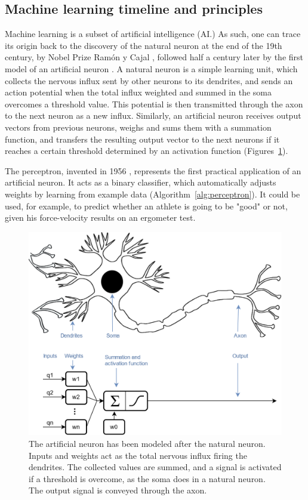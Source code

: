 \subsection{Machine learning timeline and principles}

Machine learning is a subset of artificial intelligence (AI.) As such, one can trace its origin back to the discovery of the natural neuron at the end of the 19th century, by Nobel Prize Ramón y Cajal \cite{Lopez2006}, followed half a century later by the first model of an artificial neuron \cite{Mcculloch1943}. A natural neuron is a simple learning unit, which collects the nervous influx sent by other neurons to its dendrites, and sends an action potential when the total influx weighted and summed in the soma overcomes a threshold value. This potential is then transmitted through the axon to the next neuron as a new influx. Similarly, an artificial neuron receives output vectors from previous neurons, weighs and sums them with a summation function, and transfers the resulting output vector to the next neurons if it reaches a certain threshold determined by an activation function (Figures~\ref{fig_neuron}). 

The perceptron, invented in 1956 \cite{Rosenblatt1958}, represents the first practical application of an artificial neuron. It acts as a binary classifier, which automatically adjusts weights by learning from example data (Algorithm~\ref{alg:perceptron}). It could be used, for example, to predict whether an athlete is going to be "good" or not, given his force-velocity results on an ergometer test. 

\newpage


\begin{figure}[hbtp]
	\centering
	\def\svgwidth{1\columnwidth}
	\fontsize{10pt}{10pt}\selectfont
	\includegraphics[width=\linewidth]{"../Chap2/Figures/Fig_neuron.png"}
	\caption{The artificial neuron has been modeled after the natural neuron. Inputs and weights act as the total nervous influx firing the dendrites. The collected values are summed, and a signal is activated if a threshold is overcome, as the soma does in a natural neuron. The output signal is conveyed through the axon.}
	\label{fig_neuron}
\end{figure}

